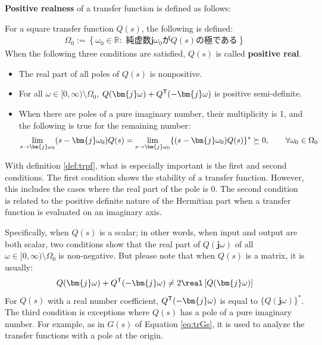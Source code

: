 \documentclass[graybox, envcountchap]{svmult}
\begin{document}
\textbf{Positive realness} of a transfer function is defined as follows:

\begin{definition}\label{def:trpf}
For a square transfer function $Q(s)$, the following is defined:
\begin{align}\label{eq:defOm0}
\Omega_0 := \left\{
\omega_0 \in \mathbb{R}: 
\mbox{ 純虚数$\bm{j} \omega_0$が$Q(s)$の極である}
\right\}
\end{align}
When the following three conditions are satisfied, $Q(s)$ is called \textbf{positive real}.
\begin{itemize}
\item The real part of all poles of $Q(s)$ is nonpositive.
\item For all $\omega \in [0,\infty)\setminus \Omega_0$, $Q(\bm{j} \omega) + Q^{\sf T}(-\bm{j} \omega)$ is positive semi-definite.
\item When there are poles of a pure imaginary number, their multiplicity is 1, and the following is true for the remaining number: 
\begin{align*}
\lim_{s \rightarrow \bm{j} \omega_0} (s-\bm{j} \omega_0) Q(s) = \lim_{s\rightarrow \bm{j} \omega_0} \{ (s-\bm{j} \omega_0) Q(s)\}^{\sf *}\succeq 0
,\qquad
\forall \omega_0 \in \Omega_0
\end{align*}
\end{itemize}
\end{definition}


With definition \ref{def:trpf}, what is especially important is the first and second conditions.
The first condition shows the stability of a transfer function.
However, this includes the cases where the real part of the pole is 0.
The second condition is related to the positive definite nature of the Hermitian part when a transfer function is evaluated on an imaginary axis.

Specifically, when $Q(s)$ is a scalar; in other words, when input and output are both scalar, two conditions show that the real part of $Q(\bm{j}\omega)$ of all $\omega \in [0,\infty)\setminus \Omega_0$ is non-negative.
But please note that when $Q(s)$ is a matrix, it is usually:
\begin{align*}
Q(\bm{j} \omega) + Q^{\sf T}(-\bm{j} \omega) \neq 2 \real\left[ Q(\bm{j} \omega) \right]
\end{align*}
For $Q(s)$ with a real number coefficient, $Q^{\sf T}( -\bm{j} \omega)$ is equal to $\{Q(\bm{j} \omega)\}^*$.
The third condition is exceptions where $Q(s)$ has a pole of a pure imaginary number.
For example, as in $G(s)$ of Equation \ref{eq:trGs}, it is used to analyze the transfer functions with a pole at the origin.
\end{document}
